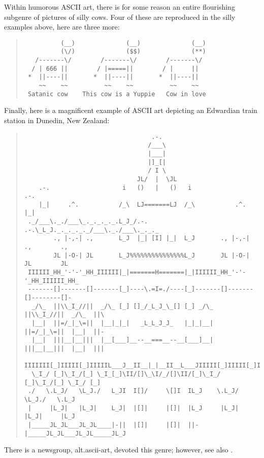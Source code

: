 Within humorous ASCII art, there is for some reason an entire flourishing subgenre of pictures of silly cows. Four of these are reproduced
in the silly examples above, here are three more:

\begin{quote}
	\begin{verbatim}
          (__)              (__)              (__)
          (\/)              ($$)              (**)
   /-------\/        /-------\/        /-------\/
  / | 666 ||        / |=====||        / |     ||
 *  ||----||       *  ||----||       *  ||----||
    ~~    ~~          ~~    ~~          ~~    ~~
 Satanic cow    This cow is a Yuppie   Cow in love
	\end{verbatim}
\end{quote}

Finally, here is a magnificent example of ASCII art depicting an Edwardian train station in Dunedin, New Zealand:

\begin{quote}
	\begin{verbatim}
                                   .-.
                                  /___\
                                  |___|
                                  |]_[|
                                  / I \
                               JL/  |  \JL
    .-.                    i   ()   |   ()   i                    .-.
    |_|     .^.           /_\  LJ=======LJ  /_\           .^.     |_|
 ._/___\._./___\_._._._._.L_J_/.-.     .-.\_L_J._._._._._/___\._./___\._._._
        ., |-,-| .,       L_J  |_| [I] |_|  L_J       ., |-,-| .,        .,
        JL |-O-| JL       L_J%%%%%%%%%%%%%%%L_J       JL |-O-| JL        JL
 IIIIII_HH_'-'-'_HH_IIIIII|_|=======H=======|_|IIIIII_HH_'-'-'_HH_IIIIII_HH_
 -------[]-------[]-------[_]----\.=I=./----[_]-------[]-------[]--------[]-
  _/\_  ||\\_I_//||  _/\_ [_] []_/_L_J_\_[] [_] _/\_  ||\\_I_//||  _/\_  ||\
  |__|  ||=/_|_\=||  |__|_|_|   _L_L_J_J_   |_|_|__|  ||=/_|_\=||  |__|  ||-
  |__|  |||__|__|||  |__[___]__--__===__--__[___]__|  |||__|__|||  |__|  |||
 IIIIIII[_]IIIII[_]IIIIIL___J__II__|_|__II__L___JIIIII[_]IIIII[_]IIIIIIII[_]
  \_I_/ [_]\_I_/[_] \_I_[_]\II/[]\_\I/_/[]\II/[_]\_I_/ [_]\_I_/[_] \_I_/ [_]
 ./   \.L_J/   \L_J./   L_JI  I[]/     \[]I  IL_J    \.L_J/   \L_J./   \.L_J
 |     |L_J|   |L_J|    L_J|  |[]|     |[]|  |L_J     |L_J|   |L_J|     |L_J
 |_____JL_JL___JL_JL____|-||  |[]|     |[]|  ||-|_____JL_JL___JL_JL_____JL_J
	\end{verbatim}
\end{quote}

There is a newsgroup, alt.ascii-art, devoted this genre; however, see also .

